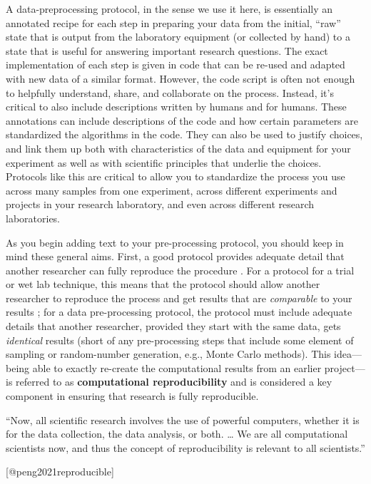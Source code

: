\documentclass[]{tufte-book}
\begin{document}
A data-preprocessing protocol, in the sense we use it here, is essentially an
annotated recipe for each step in preparing your data from the initial, ``raw''
state that is output from the laboratory equipment (or collected by hand) to a
state that is useful for answering important research questions. The exact
implementation of each step is given in code that can be re-used and adapted
with new data of a similar format. However, the code script is often not enough
to helpfully understand, share, and collaborate on the process. Instead, it's
critical to also include descriptions written by humans and for humans. These
annotations can include descriptions of the code and how certain parameters are
standardized the algorithms in the code. They can also be used to justify
choices, and link them up both with characteristics of the data and equipment
for your experiment as well as with scientific principles that underlie the
choices. Protocols like this are critical to allow you to standardize the
process you use across many samples from one experiment, across different
experiments and projects in your research laboratory, and even across different
research laboratories.

As you begin adding text to your pre-processing protocol, you should keep in
mind these general aims. First, a good protocol provides adequate detail that
another researcher can fully reproduce the procedure \citep{al2016protocol}. For a
protocol for a trial or wet lab technique, this means that the protocol should
allow another researcher to reproduce the process and get results that are
\emph{comparable} to your results \citep{al2016protocol}; for a data pre-processing
protocol, the protocol must include adequate details that another researcher,
provided they start with the same data, gets \emph{identical} results (short of any
pre-processing steps that include some element of sampling or random-number
generation, e.g., Monte Carlo methods). This idea---being able to exactly
re-create the computational results from an earlier project---is referred to as
\textbf{computational reproducibility} and is considered a key component in
ensuring that research is fully reproducible.

\begin{marginfigure}
``Now, all scientific research involves the use of powerful computers,
whether it is for the data collection, the data analysis, or both.
\ldots{} We are all computational scientists now, and thus the concept
of reproducibility is relevant to all scientists.''

{[}@peng2021reproducible{]}
\end{marginfigure}
\end{document}
